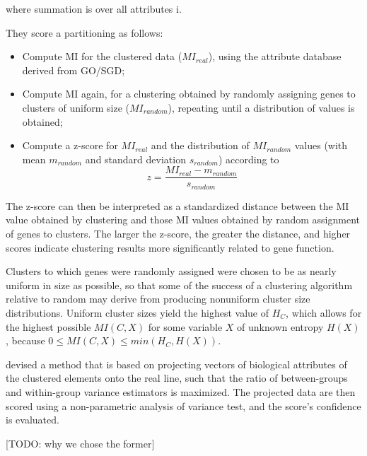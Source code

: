 where summation is over all attributes i.

They score a partitioning as follows: 
\begin{itemize}
 \item Compute MI for the clustered data ($MI_{real}$), using the attribute database derived from GO/SGD; 
 \item Compute MI again, for a clustering obtained by randomly assigning genes to clusters of uniform size ($MI_{random}$), repeating until a distribution of values is obtained; 
 \item Compute a z-score for $MI_{real}$ and the distribution of $MI_{random}$ values (with mean $m_{random}$ and standard deviation $s_{random}$) according to 
\[
z = \frac{MI_{real}-m_{random}}{s_{random}} 
\]
\end{itemize}

The z-score can then be interpreted as a standardized distance between the MI value obtained by clustering and those MI values obtained by random assignment of genes to clusters. 
The larger the z-score, the greater the distance, and higher scores indicate clustering results more significantly related to gene function.

Clusters to which genes were randomly assigned were chosen to be as nearly uniform in size as possible, so that some of the success of a clustering algorithm relative 
to random may derive from producing nonuniform cluster size distributions. Uniform cluster sizes yield the highest value of $H_{C}$, which allows for the highest 
possible $MI(C,X)$ for some variable $X$ of unknown entropy $H(X)$, because $0 \leq MI(C,X) \leq min(H_{C},H(X))$.

\citet{gatviks03scoring} devised a method that is based on projecting vectors of biological attributes of the clustered elements onto the real line, such that the ratio 
of between-groups and within-group variance estimators is maximized. The projected data are then scored using a non-parametric analysis of variance test, and the 
score’s conﬁdence is evaluated.

[TODO: why we chose the former]


